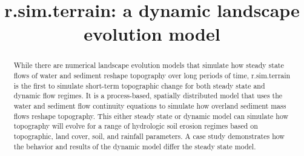 \documentclass[esurf, manuscript]{copernicus}
\begin{document}
\title{\lowercase{r.sim.terrain}: a dynamic landscape evolution model} %






\received{}
\pubdiscuss{} %
\revised{}
\accepted{}
\published{}


\maketitle

\begin{abstract}
While there are numerical landscape evolution models
that simulate how steady state flows of water and sediment
reshape topography over long periods of time, 
r.sim.terrain is the first to simulate short-term topographic change 
for both steady state and dynamic flow regimes. 
It is a process-based, spatially distributed model
that uses the water and sediment flow continuity equations
to simulate how overland sediment mass flows 
reshape topography. 
This either steady state or dynamic model can simulate 
how topography will evolve for a range of hydrologic soil erosion regimes
based on topographic, land cover, soil, and rainfall parameters. 
A case study demonstrates how the behavior and results of 
the dynamic model differ the steady state model. 
\end{abstract}


\end{document}
